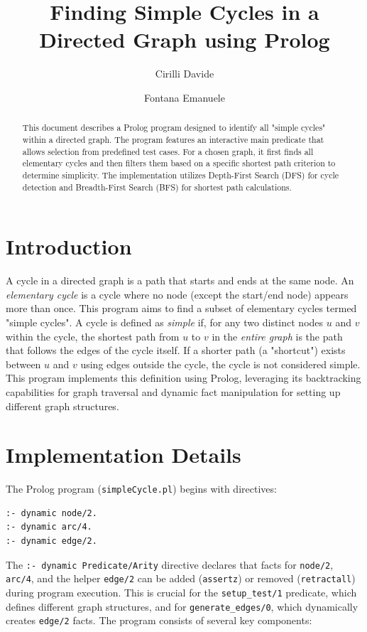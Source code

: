 \documentclass[12pt,a4paper]{article}
\title{Finding Simple Cycles in a Directed Graph using Prolog}
\author[1]{Cirilli Davide}
\author[2]{Fontana Emanuele}
\affil[1,2]{Department of Computer Science, Università degli Studi di Bari}
\begin{document}
\maketitle
\begin{abstract}
This document describes a Prolog program designed to identify all "simple cycles" within a directed graph. The program features an interactive main predicate that allows selection from predefined test cases. For a chosen graph, it first finds all elementary cycles and then filters them based on a specific shortest path criterion to determine simplicity. The implementation utilizes Depth-First Search (DFS) for cycle detection and Breadth-First Search (BFS) for shortest path calculations.
\end{abstract}
\tableofcontents
\section{Introduction}
A cycle in a directed graph is a path that starts and ends at the same node. An \textit{elementary cycle} is a cycle where no node (except the start/end node) appears more than once. This program aims to find a subset of elementary cycles termed "simple cycles".
A cycle is defined as \textit{simple} if, for any two distinct nodes 
$u$ 
 and 
$v$ 
 within the cycle, the shortest path from 
$u$ 
 to 
$v$ 
 in the \textit{entire graph} is the path that follows the edges of the cycle itself. If a shorter path (a "shortcut") exists between 
$u$ 
 and 
$v$ 
 using edges outside the cycle, the cycle is not considered simple.
This program implements this definition using Prolog, leveraging its backtracking capabilities for graph traversal and dynamic fact manipulation for setting up different graph structures.
\section{Implementation Details}
The Prolog program (\texttt{simpleCycle.pl}) begins with directives:
\begin{verbatim}
:- dynamic node/2.
:- dynamic arc/4.
:- dynamic edge/2.
\end{verbatim}
The \texttt{:- dynamic Predicate/Arity} directive declares that facts for \texttt{node/2}, \texttt{arc/4}, and the helper \texttt{edge/2} can be added (\texttt{assertz}) or removed (\texttt{retractall}) during program execution. This is crucial for the \texttt{setup\_test/1} predicate, which defines different graph structures, and for \texttt{generate\_edges/0}, which dynamically creates \texttt{edge/2} facts.
The program consists of several key components:
\end{document}
